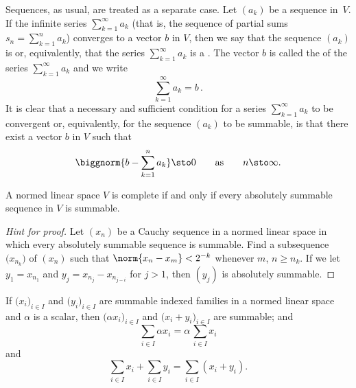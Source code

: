 \begin{defn}
Sequences, as usual, are treated as a separate case.  Let $(a_k)$ be a sequence in~$V$.  If the infinite series
$\sum_{k=1}^\infty a_k$ (that is, the sequence of
partial sums $s_n = \sum_{k=1}^n a_k$) converges to a
vector $b$ in $V$, then we say that the sequence $(a_k)$ is
 or, equivalently, that the series $\sum_{k=1}^\infty a_k$ is a
.  The vector $b$ is called the
 of the series $\sum_{k=1}^\infty a_k$ and we write
  \[ \sum_{k=1}^\infty a_k = b\,. \]
It is clear that a necessary and sufficient condition for a series $\sum_{k=1}^\infty a_k$ to
be convergent or, equivalently, for the sequence $(a_k)$ to be summable, is that there exist a
vector $b$ in $V$ such that
  \begin{equation}\label{cond_ser_conv}
     \biggnorm{b - \sum_{k=1}^n a_k} \sto 0 \qquad \text{as} \qquad n \sto \infty.
  \end{equation}
\end{defn}

\begin{prop}\label{prop_abs_sum_implies_sum} A normed linear space $V$ is complete if and only if every absolutely
summable sequence in $V$ is summable.
\end{prop}

\begin{proof}[\emph{Hint for proof}] Let $(x_n)$ be a Cauchy sequence in a normed linear space in which every absolutely
summable sequence is summable.  Find a subsequence $\bigl(x_{n_k}\bigr)$ of $(x_n)$ such that $\norm{x_n - x_m} < 2^{-k}$
whenever $m$, $n \ge n_k$.  If we let $y_1 = x_{n_1}$ and $y_j = x_{n_j} - x_{n_{j-i}}$ for $j > 1$, then $(y_j)$ is
absolutely summable.   \ns
\end{proof}

\begin{prop} If $\bigl(x_i\bigr)_{i \in I}$ and $\bigl(y_i\bigr)_{i \in I}$ are
summable indexed families in a normed linear space and $\alpha$ is a scalar, then
$\bigl(\alpha x_i\bigr)_{i \in I}$ and $\bigl(x_i + y_i\bigr)_{i \in I}$
are summable; and
  \[ \sum_{i \in I} \alpha x_i = \alpha \, \sum_{i \in I} x_i \]
and
  \[ \sum_{i \in I} x_i + \sum_{i \in I} y_i =
                         \sum_{i \in I} (x_i + y_i). \]
\end{prop}

